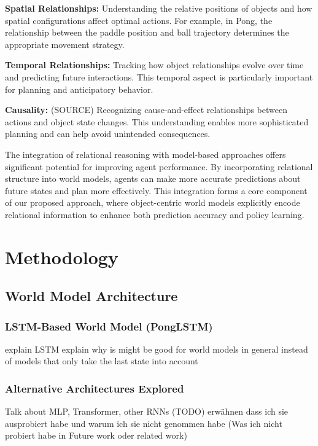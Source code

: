 \documentclass[
	english,
	ruledheaders=section,
	class=report,
	thesis={type=master},
	accentcolor=9c,
	custommargins=true,
	marginpar=false,
	parskip=half-,
	fontsize=11pt,
]{tudapub}
\begin{document}
\textbf{Spatial Relationships:} Understanding the relative positions of objects and how spatial configurations affect optimal actions. For example, in Pong, the relationship between the paddle position
and ball trajectory determines the appropriate movement strategy.

\textbf{Temporal Relationships:} Tracking how object relationships evolve over time and predicting future interactions. This temporal aspect is particularly important for planning and anticipatory behavior.

\textbf{Causality:} (SOURCE) Recognizing cause-and-effect relationships between actions and object state changes. This understanding enables more sophisticated planning and can help avoid unintended consequences.

The integration of relational reasoning with model-based approaches offers
significant potential for improving agent performance. By incorporating
relational structure into world models, agents can make more accurate
predictions about future states and plan more effectively. This integration
forms a core component of our proposed approach, where object-centric world
models explicitly encode relational information to enhance both prediction
accuracy and policy learning.

\chapter{Methodology}
\label{chap:methodology}

\section{World Model Architecture}
\label{sec:world_model_arch}

\subsection{LSTM-Based World Model (PongLSTM)}
\label{subsec:ponglstm}
explain LSTM
explain why is might be good for world models in general instead of models that only take the last state into account

\subsection{Alternative Architectures Explored}
\label{subsec:alternative_architectures}
Talk about MLP, Transformer, other RNNs
(TODO) erwähnen dass ich sie ausprobiert habe und warum ich sie nicht genommen habe
(Was ich nicht probiert habe in Future work oder related work)
\end{document}
